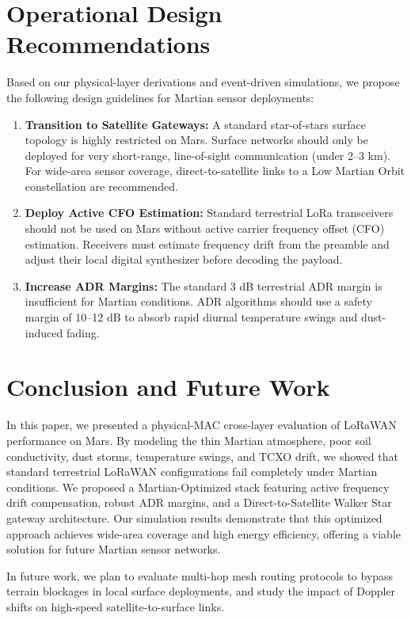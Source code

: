 \documentclass{ijuc}
\begin{document}
\section{Operational Design Recommendations}
\label{sec:discussion}
Based on our physical-layer derivations and event-driven simulations, we propose the following design guidelines for Martian sensor deployments:
\begin{enumerate}
    \item \textbf{Transition to Satellite Gateways:} A standard star-of-stars surface topology is highly restricted on Mars. Surface networks should only be deployed for very short-range, line-of-sight communication (under 2--3 km). For wide-area sensor coverage, direct-to-satellite links to a Low Martian Orbit constellation are recommended.
    \item \textbf{Deploy Active CFO Estimation:} Standard terrestrial LoRa transceivers should not be used on Mars without active carrier frequency offset (CFO) estimation. Receivers must estimate frequency drift from the preamble and adjust their local digital synthesizer before decoding the payload.
    \item \textbf{Increase ADR Margins:} The standard 3 dB terrestrial ADR margin is insufficient for Martian conditions. ADR algorithms should use a safety margin of 10--12 dB to absorb rapid diurnal temperature swings and dust-induced fading.
\end{enumerate}

\section{Conclusion and Future Work}
\label{sec:conclusion}
In this paper, we presented a physical-MAC cross-layer evaluation of LoRaWAN performance on Mars. By modeling the thin Martian atmosphere, poor soil conductivity, dust storms, temperature swings, and TCXO drift, we showed that standard terrestrial LoRaWAN configurations fail completely under Martian conditions. We proposed a Martian-Optimized stack featuring active frequency drift compensation, robust ADR margins, and a Direct-to-Satellite Walker Star gateway architecture. Our simulation results demonstrate that this optimized approach achieves wide-area coverage and high energy efficiency, offering a viable solution for future Martian sensor networks.

In future work, we plan to evaluate multi-hop mesh routing protocols to bypass terrain blockages in local surface deployments, and study the impact of Doppler shifts on high-speed satellite-to-surface links.


\end{document}
